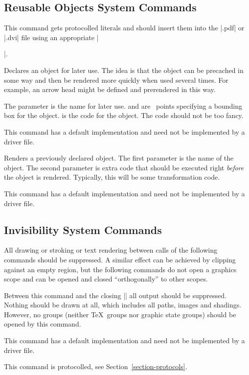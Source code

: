 \subsection{Reusable Objects System Commands}

\begin{command}{\pgfsys@invoke{}}
  This command gets protocolled literals and should insert them into
  the |.pdf| or |.dvi| file using an appropriate |\special|.
\end{command}

\begin{command}{\pgfsys@defobject{}}
  Declares an object for later use. The idea is that the object can be
  precached in some way and then be rendered more quickly when used
  several times. For example, an arrow head might be defined and
  prerendered in this way.

  The parameter  is the name for later use.  and  are \pgfname\ points specifying a bounding
  box for the object.  is the code for the object. The code
  should not be too fancy.

  This command has a default implementation and need not be
  implemented by a driver file.
\end{command}

\begin{command}{\pgfsys@useobject{}}
  Renders a previously declared object. The first parameter is the
  name of the object. The second parameter is extra code that
  should be executed right \emph{before} the object is
  rendered. Typically, this will be some transformation code.

  This command has a default implementation and need not be
  implemented by a driver file.
\end{command}


\subsection{Invisibility System Commands}

All drawing or stroking or text rendering between calls of the
following commands should be suppressed. A similar effect can be
achieved by clipping against an empty region, but the following
commands do not open a graphics scope and can be opened and closed
``orthogonally'' to other scopes.

\begin{command}{\pgfsys@begininvisible}
  Between this command and the closing |\pgfsys@endinvisible| all
  output should be suppressed. Nothing should be drawn at all, which
  includes all paths, images and shadings. However, no groups (neither
  \TeX\ groups nor graphic state groups) should be opened by this
  command.

  This command has a default implementation and need not be
  implemented by a driver file.

  This command is protocolled, see Section~\ref{section-protocols}.
\end{command}

